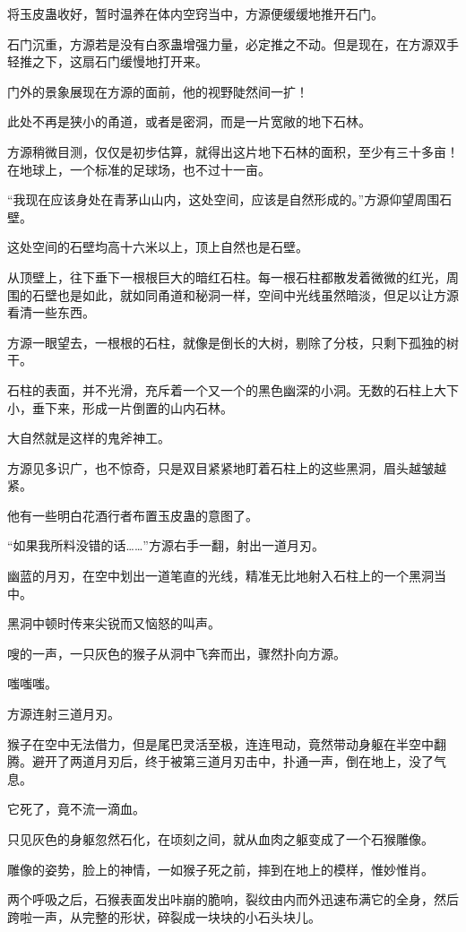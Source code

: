 \begin{this_body}
将玉皮蛊收好，暂时温养在体内空窍当中，方源便缓缓地推开石门。

石门沉重，方源若是没有白豕蛊增强力量，必定推之不动。但是现在，在方源双手轻推之下，这扇石门缓慢地打开来。

门外的景象展现在方源的面前，他的视野陡然间一扩！

此处不再是狭小的甬道，或者是密洞，而是一片宽敞的地下石林。

方源稍微目测，仅仅是初步估算，就得出这片地下石林的面积，至少有三十多亩！在地球上，一个标准的足球场，也不过十一亩。

“我现在应该身处在青茅山山内，这处空间，应该是自然形成的。”方源仰望周围石壁。

这处空间的石壁均高十六米以上，顶上自然也是石壁。

从顶壁上，往下垂下一根根巨大的暗红石柱。每一根石柱都散发着微微的红光，周围的石壁也是如此，就如同甬道和秘洞一样，空间中光线虽然暗淡，但足以让方源看清一些东西。

方源一眼望去，一根根的石柱，就像是倒长的大树，剔除了分枝，只剩下孤独的树干。

石柱的表面，并不光滑，充斥着一个又一个的黑色幽深的小洞。无数的石柱上大下小，垂下来，形成一片倒置的山内石林。

大自然就是这样的鬼斧神工。

方源见多识广，也不惊奇，只是双目紧紧地盯着石柱上的这些黑洞，眉头越皱越紧。

他有一些明白花酒行者布置玉皮蛊的意图了。

“如果我所料没错的话……”方源右手一翻，射出一道月刃。

幽蓝的月刃，在空中划出一道笔直的光线，精准无比地射入石柱上的一个黑洞当中。

黑洞中顿时传来尖锐而又恼怒的叫声。

嗖的一声，一只灰色的猴子从洞中飞奔而出，骤然扑向方源。

嗤嗤嗤。

方源连射三道月刃。

猴子在空中无法借力，但是尾巴灵活至极，连连甩动，竟然带动身躯在半空中翻腾。避开了两道月刃后，终于被第三道月刃击中，扑通一声，倒在地上，没了气息。

它死了，竟不流一滴血。

只见灰色的身躯忽然石化，在顷刻之间，就从血肉之躯变成了一个石猴雕像。

雕像的姿势，脸上的神情，一如猴子死之前，摔到在地上的模样，惟妙惟肖。

两个呼吸之后，石猴表面发出咔崩的脆响，裂纹由内而外迅速布满它的全身，然后跨啦一声，从完整的形状，碎裂成一块块的小石头块儿。


\end{this_body}
